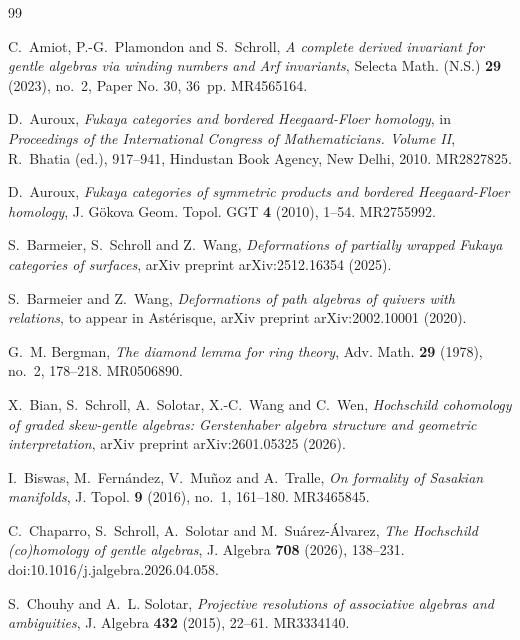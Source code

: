 \documentclass[a4paper, reqno, 11pt]{amsart}
\theoremstyle{definition}
\begin{document}
\begin{thebibliography}{99}
	
	C.~Amiot, P.-G.~Plamondon and S.~Schroll,
	\emph{A complete derived invariant for gentle algebras via winding numbers and Arf invariants},
	Selecta Math. (N.S.) \textbf{29} (2023), no.~2, Paper No. 30, 36~pp. MR4565164.   
	
	D.~Auroux,
	\emph{Fukaya categories and bordered Heegaard-Floer homology},
	in {\it Proceedings of the International Congress of Mathematicians. Volume II},
	R.~Bhatia (ed.), 917--941,
	Hindustan Book Agency, New Delhi, 2010.
	MR2827825.
	
	D.~Auroux,
	\emph{Fukaya categories of symmetric products and bordered Heegaard-Floer homology},
	J. G\"{o}kova Geom. Topol. GGT \textbf{4} (2010), 1--54. MR2755992.
	
	S.~Barmeier, S.~Schroll and Z.~Wang,
	\emph{Deformations of partially wrapped Fukaya categories of surfaces}, arXiv preprint arXiv:2512.16354 (2025).
	
	S.~Barmeier and Z.~Wang,
	\emph{Deformations of path algebras of quivers with relations}, to appear in Ast\'{e}risque,
	arXiv preprint arXiv:2002.10001 (2020).
	
	G.~M. Bergman,
	\emph{The diamond lemma for ring theory},
	Adv. Math. \textbf{29} (1978), no.~2, 178--218. MR0506890.
	
	 X.~Bian, S.~Schroll, A.~Solotar, X.-C.~Wang and C.~Wen, \emph{Hochschild cohomology of graded skew-gentle algebras: Gerstenhaber algebra structure and geometric interpretation}, arXiv preprint arXiv:2601.05325 (2026).
	
	I.~Biswas, M.~Fern\'andez, V.~Mu\~noz and A.~Tralle,
	\emph{On formality of Sasakian manifolds},
	J. Topol. \textbf{9} (2016), no.~1, 161--180. MR3465845.
	
	C.~Chaparro, S.~Schroll, A.~Solotar and M.~Su\'arez-\'Alvarez,
	\emph{The Hochschild (co)homology of gentle algebras},
	J. Algebra \textbf{708} (2026), 138--231.
	doi:10.1016/j.jalgebra.2026.04.058.
	
	S.~Chouhy and A.~L. Solotar,
	\emph{Projective resolutions of associative algebras and ambiguities},
	J. Algebra \textbf{432} (2015), 22--61. MR3334140.
	

\end{thebibliography}
\end{document}

